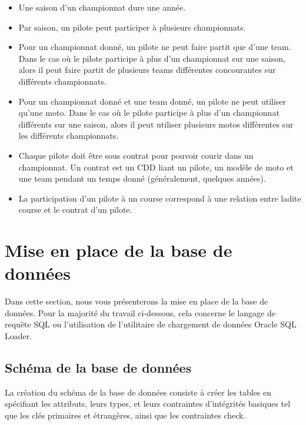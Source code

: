 \documentclass[12pt,a4paper]{article}
\begin{document}
\begin{itemize}
    \item Une saison d'un championnat dure une année.

    \item Par saison, un pilote peut participer à plusieurs championnats.

    \item Pour un championnat donné, un pilote ne peut faire partit que d'une
        team. Dans le cas où le pilote participe à plus d'un championnat sur une
        saison, alors il peut faire partit de plusieurs teams différentes
        concourantes sur différents championnats.

    \item Pour un championnat donné et une team donné, un pilote ne peut
        utiliser qu'une moto. Dans le cas où le pilote participe à plus d'un
        championnat différents sur une saison, alors il peut utiliser plusieurs
        motos différentes sur les différents championnats.

    \item Chaque pilote doit être sous contrat pour pouvoir courir dans un
        championnat. Un contrat est  un CDD liant un pilote, un modèle de moto
        et une team pendant un temps donné (généralement, quelques années).

    \item La participation d’un pilote à un course correspond à une relation
        entre ladite course et le contrat d’un pilote.
\end{itemize}

\section{Mise en place de la base de données}
\label{sec.reference}

Dans cette section, nous vous présenterons la mise en place de la base de
données. Pour la majorité du travail ci-dessous, cela concerne le langage de
requête SQL ou l’utilisation de l’utilitaire de chargement de données Oracle SQL
Loader.

\subsection{Schéma de la base de données}
\label{sub.scheme}

La création du schéma de la base de données consiste à créer les tables en
spécifiant les attributs, leurs types, et leurs contraintes d'intégrités
basiques tel que les clés primaires et étrangères, ainsi que les contraintes
check.
\end{document}
